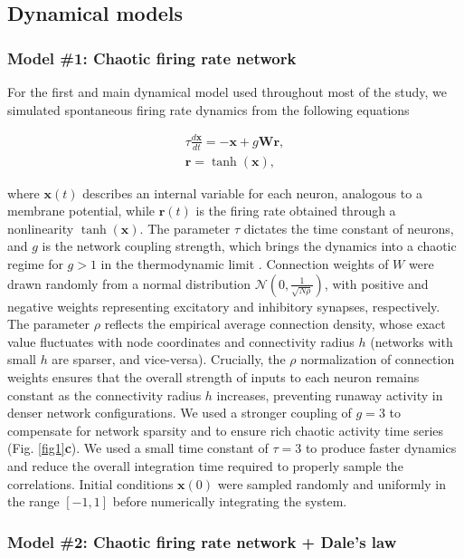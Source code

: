 \documentclass{article}
\begin{document}
\subsection*{Dynamical models}

\subsubsection*{Model \#1: Chaotic firing rate network}

For the first and main dynamical model used throughout most of the study, we simulated spontaneous firing rate dynamics from the following equations

\begin{align*}
    \tau\frac{d\textbf{x}}{dt}=-\textbf{x} + g\textbf{W}\textbf{r},\\
    \textbf{r}=\tanh{(\textbf{x})},
\end{align*}

where $\textbf{x}(t)$ describes an internal variable for each neuron, analogous to a membrane potential, while $\textbf{r}(t)$ is the firing rate obtained through a nonlinearity $\tanh (\textbf{x})$. The parameter $\tau$ dictates the time constant of neurons, and $g$ is the network coupling strength, which brings the dynamics into a chaotic regime for $g>1$ in the thermodynamic limit \cite{sompolinsky1988chaos}. Connection weights of $W$ were drawn randomly from a normal distribution $\mathcal{N}(0, \frac{1}{\sqrt{N\rho}})$, with positive and negative weights representing excitatory and inhibitory synapses, respectively. The parameter $\rho$ reflects the empirical average connection density, whose exact value fluctuates with node coordinates and connectivity radius $h$ (networks with small $h$ are sparser, and vice-versa). Crucially, the $\rho$ normalization of connection weights ensures that the overall strength of inputs to each neuron remains constant as the connectivity radius $h$ increases, preventing runaway activity in denser network configurations. We used a stronger coupling of $g=3$ to compensate for network sparsity and to ensure rich chaotic activity time series (Fig. \ref{fig1}\textbf{c}). We used a small time constant of $\tau=3$ to produce faster dynamics and reduce the overall integration time required to properly sample the correlations. Initial conditions $\textbf{x}(0)$ were sampled randomly and uniformly in the range $[-1, 1]$ before numerically integrating the system.

\subsubsection*{Model \#2: Chaotic firing rate network + Dale's law}
\end{document}
